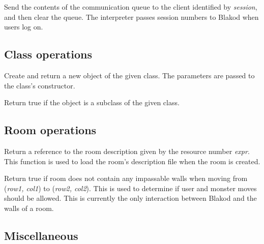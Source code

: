 \documentclass[12pt]{article}
\newenvironment{leftlines}
{\setlength{\oldindent}{\parindent}
 \setlength{\parindent}{0in}\vspace{\baselineskip}}
{\setlength{\parindent}{\oldindent}\vspace{\baselineskip}}
\begin{document}
\begin{leftlines}
\end{leftlines}

Send the contents of the communication queue to the client identified
by {\em session}, and then clear the queue.  The interpreter passes
session numbers to Blakod when users log on.

\subsection{Class operations}

\begin{leftlines}
\end{leftlines}

Create and return a new object of the given class.  The parameters are
passed to the class's constructor.

\begin{leftlines}
\end{leftlines}

Return true if the object is a subclass of the given class.

\subsection{Room operations}

\begin{leftlines}
\end{leftlines}

Return a reference to the room description given by the resource
number {\em expr}.  This function is used to load the room's
description file when the room is created.

\begin{leftlines}
\end{leftlines}

Return true if room does not contain any impassable walls when moving
from ({\em row1, col1}) to ({\em row2, col2}).  This is used to
determine if user and monster moves should be allowed.  This is
currently the only interaction between Blakod and the walls of a
room.

\subsection{Miscellaneous}
\end{document}
